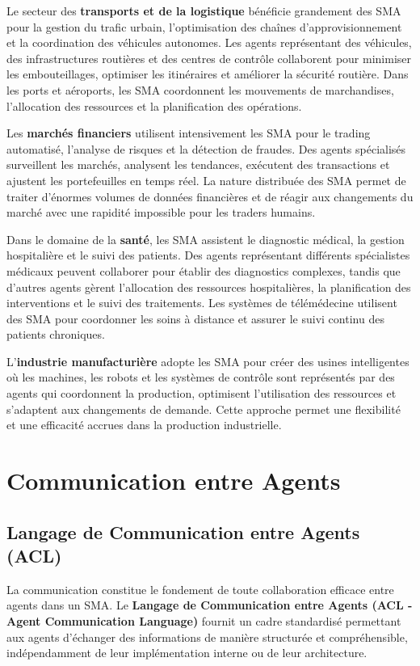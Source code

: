 Le secteur des \textbf{transports et de la logistique} bénéficie grandement des SMA pour la gestion du trafic urbain, l'optimisation des chaînes d'approvisionnement et la coordination des véhicules autonomes. Les agents représentant des véhicules, des infrastructures routières et des centres de contrôle collaborent pour minimiser les embouteillages, optimiser les itinéraires et améliorer la sécurité routière. Dans les ports et aéroports, les SMA coordonnent les mouvements de marchandises, l'allocation des ressources et la planification des opérations.

Les \textbf{marchés financiers} utilisent intensivement les SMA pour le trading automatisé, l'analyse de risques et la détection de fraudes. Des agents spécialisés surveillent les marchés, analysent les tendances, exécutent des transactions et ajustent les portefeuilles en temps réel. La nature distribuée des SMA permet de traiter d'énormes volumes de données financières et de réagir aux changements du marché avec une rapidité impossible pour les traders humains.

Dans le domaine de la \textbf{santé}, les SMA assistent le diagnostic médical, la gestion hospitalière et le suivi des patients. Des agents représentant différents spécialistes médicaux peuvent collaborer pour établir des diagnostics complexes, tandis que d'autres agents gèrent l'allocation des ressources hospitalières, la planification des interventions et le suivi des traitements. Les systèmes de télémédecine utilisent des SMA pour coordonner les soins à distance et assurer le suivi continu des patients chroniques.

L'\textbf{industrie manufacturière} adopte les SMA pour créer des usines intelligentes où les machines, les robots et les systèmes de contrôle sont représentés par des agents qui coordonnent la production, optimisent l'utilisation des ressources et s'adaptent aux changements de demande. Cette approche permet une flexibilité et une efficacité accrues dans la production industrielle.

\section{Communication entre Agents}

\subsection{Langage de Communication entre Agents (ACL)}

La communication constitue le fondement de toute collaboration efficace entre agents dans un SMA. Le \textbf{Langage de Communication entre Agents (ACL - Agent Communication Language)} fournit un cadre standardisé permettant aux agents d'échanger des informations de manière structurée et compréhensible, indépendamment de leur implémentation interne ou de leur architecture.

